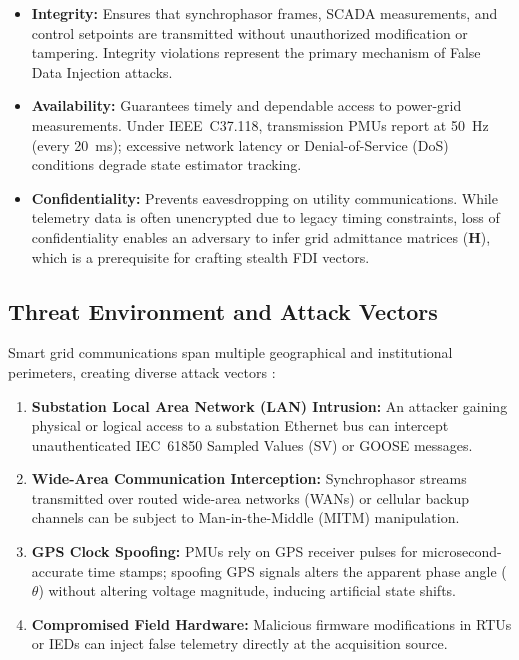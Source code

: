 \documentclass[12pt,a4paper]{report}
\begin{document}
\begin{itemize}
    \item \textbf{Integrity:} Ensures that synchrophasor frames, SCADA measurements,
    and control setpoints are transmitted without unauthorized modification or tampering.
    Integrity violations represent the primary mechanism of False Data Injection attacks.
    \item \textbf{Availability:} Guarantees timely and dependable access to power-grid
    measurements. Under IEEE~C37.118, transmission PMUs report at 50~Hz (every 20~ms);
    excessive network latency or Denial-of-Service (DoS) conditions degrade state estimator
    tracking.
    \item \textbf{Confidentiality:} Prevents eavesdropping on utility communications.
    While telemetry data is often unencrypted due to legacy timing constraints, loss of
    confidentiality enables an adversary to infer grid admittance matrices ($\boldsymbol{H}$),
    which is a prerequisite for crafting stealth FDI vectors.
\end{itemize}

\subsection{Threat Environment and Attack Vectors}
Smart grid communications span multiple geographical and institutional perimeters,
creating diverse attack vectors \cite{musleh2023,alimi2022}:
\begin{enumerate}
    \item \textbf{Substation Local Area Network (LAN) Intrusion:} An attacker gaining
    physical or logical access to a substation Ethernet bus can intercept unauthenticated
    IEC~61850 Sampled Values (SV) or GOOSE messages.
    \item \textbf{Wide-Area Communication Interception:} Synchrophasor streams transmitted
    over routed wide-area networks (WANs) or cellular backup channels can be subject to
    Man-in-the-Middle (MITM) manipulation.
    \item \textbf{GPS Clock Spoofing:} PMUs rely on GPS receiver pulses for microsecond-accurate
    time stamps; spoofing GPS signals alters the apparent phase angle ($\theta$) without
    altering voltage magnitude, inducing artificial state shifts.
    \item \textbf{Compromised Field Hardware:} Malicious firmware modifications in RTUs or
    IEDs can inject false telemetry directly at the acquisition source.
\end{enumerate}
\end{document}
